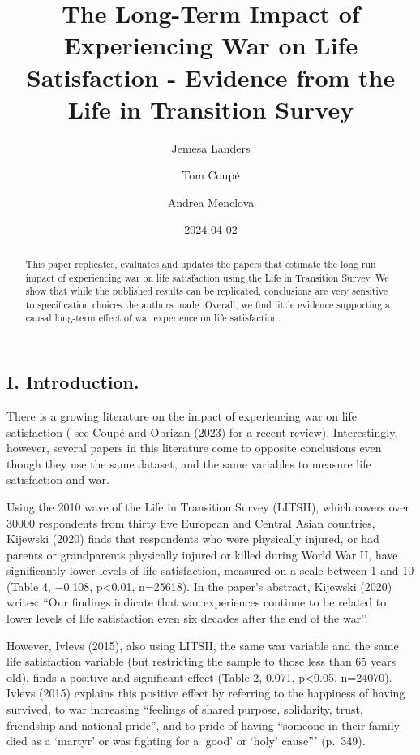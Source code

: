 \documentclass[
  letterpaper,
  DIV=11,
  numbers=noendperiod]{scrartcl}
\title{The Long-Term Impact of Experiencing War on Life Satisfaction -
Evidence from the Life in Transition Survey}
\author{Jemesa Landers \and Tom Coupé \and Andrea Menclova}
\date{2024-04-02}
\begin{document}
\maketitle
\begin{abstract}
This paper replicates, evaluates and updates the papers that estimate
the long run impact of experiencing war on life satisfaction using the
Life in Transition Survey. We show that while the published results can
be replicated, conclusions are very sensitive to specification choices
the authors made. Overall, we find little evidence supporting a causal
long-term effect of war experience on life satisfaction.
\end{abstract}
\ifdefined\Shaded\renewenvironment{Shaded}{\begin{tcolorbox}[boxrule=0pt, interior hidden, borderline west={3pt}{0pt}{shadecolor}, enhanced, sharp corners, breakable, frame hidden]}{\end{tcolorbox}}\fi

\hypertarget{i.-introduction.}{%
\subsection{I. Introduction.}\label{i.-introduction.}}

There is a growing literature on the impact of experiencing war on life
satisfaction ( see Coupé and Obrizan (2023) for a recent review).
Interestingly, however, several papers in this literature come to
opposite conclusions even though they use the same dataset, and the same
variables to measure life satisfaction and war.

Using the 2010 wave of the Life in Transition Survey (LITSII), which
covers over 30000 respondents from thirty five European and Central
Asian countries, Kijewski (2020) finds that respondents who were
physically injured, or had parents or grandparents physically injured or
killed during World War II, have significantly lower levels of life
satisfaction, measured on a scale between 1 and 10 (Table 4, −0.108,
p\textless0.01, n=25618). In the paper's abstract, Kijewski (2020)
writes: ``Our findings indicate that war experiences continue to be
related to lower levels of life satisfaction even six decades after the
end of the war''.

However, Ivlevs (2015), also using LITSII, the same war variable and the
same life satisfaction variable (but restricting the sample to those
less than 65 years old), finds a positive and significant effect (Table
2, 0.071, p\textless0.05, n=24070). Ivlevs (2015) explains this positive
effect by referring to the happiness of having survived, to war
increasing ``feelings of shared purpose, solidarity, trust, friendship
and national pride'', and to pride of having ``someone in their family
died as a `martyr' or was fighting for a `good' or `holy' cause'''
(p.~349).
\end{document}
